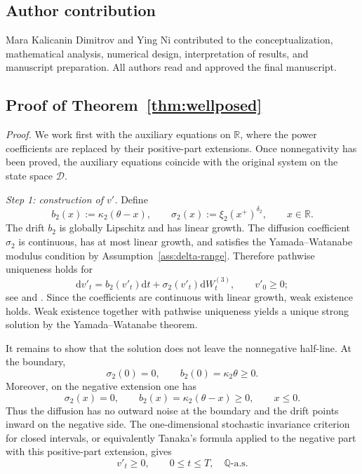 \documentclass[pdflatex,sn-mathphys-num]{sn-jnl}
\theoremstyle{thmstyleone}%
\theoremstyle{thmstylethree}%
\theoremstyle{thmstyletwo}%
\newcommand{\dd}{\mathrm d}
\newcommand{\Q}{\mathbb Q}
\newcommand{\R}{\mathbb R}
\begin{document}
\subsection*{Author contribution}
Mara Kalicanin Dimitrov and Ying Ni contributed to the conceptualization, mathematical analysis, numerical design, interpretation of results, and manuscript preparation. All authors read and approved the final manuscript.
\begin{appendices}

\section{Proof of Theorem~\ref{thm:wellposed}}\label{app:proof-wellposed}

\noindent\textit{Proof.}
We work first with the auxiliary equations on $\R$, where the power
coefficients are replaced by their positive-part extensions. Once nonnegativity
has been proved, the auxiliary equations coincide with the original system on
the state space $\mathcal D$.

\emph{Step 1: construction of $v'$.}
Define
$$
b_2(x):=\kappa_2(\theta-x),\qquad
\sigma_2(x):=\xi_2(x^+)^{\delta_2},\qquad x\in\R.
$$
The drift $b_2$ is globally Lipschitz and has linear growth. The diffusion
coefficient $\sigma_2$ is continuous, has at most linear growth, and satisfies
the Yamada--Watanabe modulus condition by Assumption~\ref{ass:delta-range}.
Therefore pathwise uniqueness holds for
$$
\dd v'_t=b_2(v'_t)\dd t+\sigma_2(v'_t)\dd W^{(3)}_t,
\qquad v'_0\ge0;
$$
see \cite{yamada1971uniqueness} and \cite[Ch.~5]{karatzas1991brownian}. Since
the coefficients are continuous with linear growth, weak existence holds. Weak
existence together with pathwise uniqueness yields a unique strong solution by
the Yamada--Watanabe theorem.

It remains to show that the solution does not leave the nonnegative half-line.
At the boundary,
$$
\sigma_2(0)=0,\qquad b_2(0)=\kappa_2\theta\ge0.
$$
Moreover, on the negative extension one has
$$
\sigma_2(x)=0,\qquad b_2(x)=\kappa_2(\theta-x)\ge0,\qquad x\le0.
$$
Thus the diffusion has no outward noise at the boundary and the drift points
inward on the negative side. The one-dimensional stochastic invariance
criterion for closed intervals, or equivalently Tanaka's formula applied to the
negative part with this positive-part extension, gives
$$
v'_t\ge0,\qquad 0\le t\le T,\quad \Q\text{-a.s.}
$$


\end{appendices}
\end{document}
